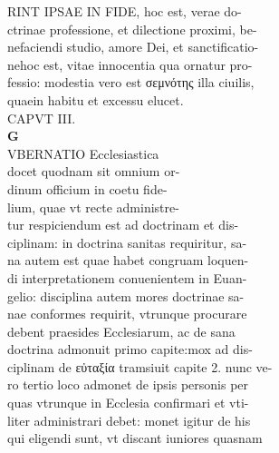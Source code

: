 \documentclass{article}
\begin{document}
\begin{pages}
                RINT IPSAE IN FIDE, hoc est, verae do- \\
                ctrinae professione, et dilectione proximi, be- \\
                nefaciendi studio, amore Dei, et sanctificatio- \\
                nehoc est, vitae innocentia qua ornatur pro- \\
                fessio: modestia vero est σεμνότης illa ciuilis, \\
                quaein habitu et excessu elucet. \\
                CAPVT III. \\
                \textbf{G \\
                }VBERNATIO Ecclesiastica \\
                docet quodnam sit omnium or- \\
                dinum officium in coetu fide- \\
                lium, quae vt recte administre- \\
                tur respiciendum est ad doctrinam et dis- \\
                ciplinam: in doctrina sanitas requiritur, sa- \\
                na autem est quae habet congruam loquen- \\
                di interpretationem conuenientem in Euan- \\
                gelio: disciplina autem mores doctrinae sa- \\
                nae conformes requirit, vtrunque procurare \\
                debent praesides Ecclesiarum, ac de sana \\
                doctrina admonuit primo capite:mox ad dis- \\
                ciplinam de εὐταξία tramsiuit capite 2. nunc ve- \\
                ro tertio loco admonet de ipsis personis per \\
                quas vtrunque in Ecclesia confirmari et vti- \\
                liter administrari debet: monet igitur de his \\
                qui eligendi sunt, vt discant iuniores quasnam \\

\end{pages}
\end{document}
